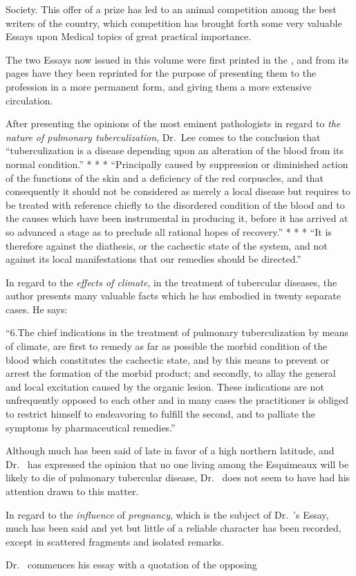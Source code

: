 Society. This offer of a prize has led to an animal competition among
the best writers of the country, which competition has brought forth
some very valuable Essays upon Medical topics of great practical importance.

The two Essays now issued in this volume were first printed in the
, and from its pages have they
been reprinted for the purpose of presenting them to the profession in
a more permanent form, and giving them a more extensive circulation.

After presenting the opinions of the most eminent pathologists in
regard to \emph{the nature of pulmonary tuberculization}, Dr.\ Lee comes to
the conclusion that ``tuberculization is a disease depending upon an
alteration of the blood from its normal condition.'' * * * ``Principally
caused by suppression or diminished action of the functions of the
skin and a deficiency of the red corpuscles, and that consequently it
should not be considered as merely a local disease but requires to be
treated with reference chiefly to the disordered condition of the blood
and to the causes which have been instrumental in producing it, before
it has arrived at so advanced a stage as to preclude all rational hopes
of recovery.'' * * * ``It is therefore against the diathesis, or the
cachectic state of the system, and not against its local manifestations
that our remedies should be directed.''

In regard to the \emph{effects of climate}, in the treatment of tubercular
diseases, the author presents many valuable facts which he has embodied
in twenty separate cases. He says:

``6.\quad{}The chief indications in the treatment of pulmonary tuberculization
by means of climate, are first to remedy as far as possible the
morbid condition of the blood which constitutes the cachectic state, and
by this means to prevent or arrest the formation of the morbid product;
and secondly, to allay the general and local excitation caused by
the organic lesion. These indications are not unfrequently opposed to
each other and in many cases the practitioner is obliged to restrict himself
to endeavoring to fulfill the second, and to palliate the symptoms
by pharmaceutical remedies.''

Although much has been said of late in favor of a high northern
latitude, and Dr.\  has expressed the opinion that no one living
among the Esquimeaux will be likely to die of pulmonary tubercular
disease, Dr.\  does not seem to have had his attention drawn to this
matter.

In regard to the \emph{influence} of \emph{pregnancy}, which is the subject of Dr.\ 's
Essay, much has been said and yet but little of a reliable character
has been recorded, except in scattered fragments and isolated remarks.

Dr.\  commences his essay with a quotation of the opposing\endinput
